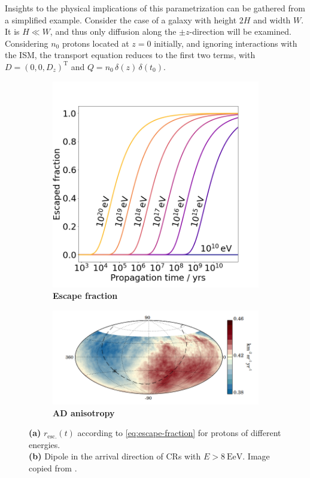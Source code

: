 Insights to the physical implications of this parametrization can be gathered from a simplified example. Consider the case of a galaxy with height $2H$ and width 
$W$. It is $H \ll W$, and thus only diffusion along the $\pm z$-direction will be examined. Considering $n_0$ protons located at $z=0$ initially, and ignoring 
interactions with the ISM, the transport equation reduces to the first two terms, with $D = \left( 0, 0, D_z \right)^\text{T}$ and 
$Q = n_0\,\delta(z)\,\delta(t_0)$.

\begin{figure}
	\begin{subfigure}[b]{0.32\textwidth}
		\centering
		\includegraphics[width=\textwidth]{./plots/galactic_diffusion.png}
		\caption{\textbf{Escape fraction}}
		\label{fig:escape-fraction}
	\end{subfigure}
	\hfill
	\begin{subfigure}[b]{0.68\textwidth}
		\centering
		\includegraphics[width=\textwidth]{./plots/auger_dipole.png}
		\caption{\textbf{AD anisotropy}}
		\label{fig:ad-anisotropy}
	\end{subfigure}
	\caption{\textbf{(a)} $r_\text{esc.}(t)$ according to \autoref{eq:escape-fraction} for protons of different energies.\\ \textbf{(b)} Dipole in the arrival
	direction of CRs with $E>\SI{8}{\exa\electronvolt}$. Image copied from \cite{pierre2017observation}.}
\end{figure}

